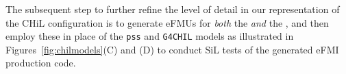 The subsequent step to further refine the level of detail in our representation of the CHiL configuration is to generate eFMUs for \emph{both} the \controller{} \emph{and} the \plant{}, and then employ these in place of the \texttt{pss} and \texttt{G4CHIL} models as illustrated in Figures~\ref{fig:chilmodels}(C) and (D) to conduct SiL tests of the generated eFMI production code.
